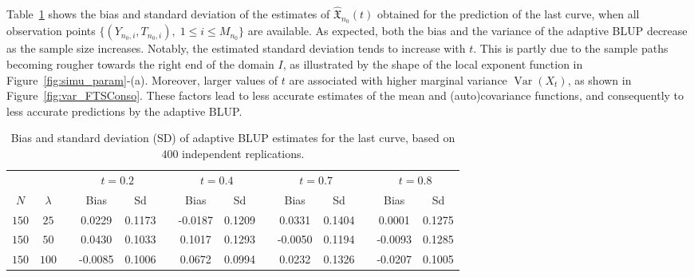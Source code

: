 Table~\ref{tab:blup_fts_conso} shows the bias and standard deviation of the estimates of $\widehat{\mathfrak{X}}_{n_0}(t)$ obtained for the prediction of the last curve, when all observation points $\{(Y_{n_0, i}, T_{n_0,i}),\; 1\leq i \leq M_{n_0}\}$ are available. As expected, both the bias and the variance of the adaptive BLUP decrease as the sample size increases. Notably, the estimated standard deviation tends to increase with $t$. This is partly due to the sample paths becoming rougher towards the right end of the domain $I$, as illustrated by the shape of the local exponent function in Figure~\ref{fig:simu_param}-(a). Moreover, larger values of $t$ are associated with higher marginal variance $\operatorname{Var}(X_t)$, as shown in Figure~\ref{fig:var_FTSConso}. These factors lead to less accurate estimates of the mean and (auto)covariance functions, and consequently to less accurate predictions by the adaptive BLUP.

\begin{table}[!tbp]
	\begin{center}
		{\small 	
			\begin{tabular}{cccccccccccccc}
				\hline
				&&&\multicolumn{2}{c}{\bfseries $t = 0.2$}&&\multicolumn{2}{c}{\bfseries $t = 0.4$}&&\multicolumn{2}{c}{\bfseries $t = 0.7$}&&\multicolumn{2}{c}{\bfseries $t = 0.8$}\\
				\cline{4-5} \cline{7-8} \cline{10-11} \cline{13-14}
				\multicolumn{1}{c}{$N$}&\multicolumn{1}{c}{$\lambda$}&&\multicolumn{1}{c}{Bias}&\multicolumn{1}{c}{Sd}&&\multicolumn{1}{c}{Bias}&\multicolumn{1}{c}{Sd}&&\multicolumn{1}{c}{Bias}&\multicolumn{1}{c}{Sd}&&\multicolumn{1}{c}{Bias}&\multicolumn{1}{c}{Sd}\tabularnewline
				\hline
				$150$&$ 25$&&0.0229&0.1173&&-0.0187&0.1209&&0.0331&0.1404&&0.0001&0.1275\\
				$150$&$ 50$&&0.0430&0.1033&&0.1017&0.1293&&-0.0050&0.1194&&-0.0093&0.1285\\
				$150$&$100$&&-0.0085&0.1006&&0.0672&0.0994&&0.0232&0.1326&&-0.0207&0.1005\\
				\hline
		\end{tabular} }
		\caption{\small Bias and standard deviation (SD) of adaptive BLUP estimates for the last curve, based on $400$ independent replications.}
		\label{tab:blup_fts_conso}
	\end{center}
\end{table}

